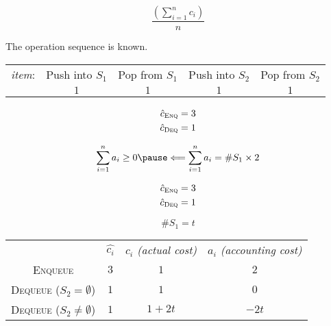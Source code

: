 \begin{frame}{}
  \centerline{}

  \vspace{0.30cm}
  \[
    \frac{\left(\sum\limits_{i = 1}^{n} c_i\right)}{n}
  \]

  \pause
  \vspace{0.50cm}
  \centerline{The operation sequence is  known.}
\end{frame}

\begin{frame}{}
  \centerline{}

  \begin{table}
    \begin{tabular}{ccccc}
      {\it item}: & Push into $S_1$ & Pop from $S_1$ & Push into $S_2$ & Pop from $S_2$ \\
      & $1$ & $1$ & $1$ & $1$
    \end{tabular}
  \end{table}

  \pause
  \vspace{-0.60cm}
  \begin{align*}
    \hat{c}_{\textsc{Enq}} &= 3 \\
    \hat{c}_{\textsc{Deq}} &= 1 \\
  \end{align*}

  \pause
  \vspace{-0.60cm}
  \[ 
    \sum_{i=1}^{n} a_i \ge 0 \pause \Longleftarrow \sum_{i=1}^{n} a_i = \#S_1 \times 2
  \]
\end{frame}

\begin{frame}{}
  \centerline{}

  \begin{align*}
    \hat{c}_{\textsc{Enq}} &= 3 \\
    \hat{c}_{\textsc{Deq}} &= 1 \\
  \end{align*}

  \vspace{-0.60cm}
  \[
    \#S_1 = t
  \]

  \begin{table}
    \begin{tabular}{c|ccc}
      & $\hat{c_i}$ & $c_i$ {\it (actual cost)} & $a_i$ {\it (accounting cost)} \\
      \textsc{Enqueue} & $3$ & $1$ & $2$ \\
      \textsc{Dequeue} ($S_2 = \emptyset$) & $1$ & $1$ & $0$ \\
      \textsc{Dequeue} ($S_2 \neq \emptyset$) & $1$ & $1+2t$ & $-2t$
    \end{tabular}
  \end{table}
\end{frame}

